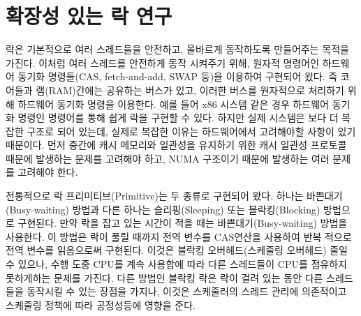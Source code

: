 \newpage
\section{확장성 있는 락 연구}
\label{sec:lockrelated}

락은 기본적으로 여러 스레드들을 안전하고, 올바르게 동작하도록 만들어주는 목적을 가진다.
이처럼 여러 스레드를 안전하게 동작 시켜주기 위해, 원자적 명령어인 하드웨어 동기화 명령들(CAS,
fetch-and-add, SWAP 등)을 이용하여 구현되어 왔다. 
즉 코어들과 램(RAM)간에는 공유하는 버스가 있고, 이러한 버스를 원자적으로 
처리하기 위해 하드웨어 동기화 명령을 이용한다. 
예를 들어 x86 시스템 같은 경우 하드웨어 동기화 명령인  명령어를 통해 쉽게 락을 구현할 수 있다.
하지만 실제 시스템은 보다 더 복잡한 구조로 되어 있는데, 
실제로 복잡한 이유는 하드웨어에서 고려해야할 사항이 있기 때문이다. 
먼저 중간에 캐시 메모리와 일관성을 유지하기 위한 캐시 일관성 
프로토콜 때문에 발생하는 문제를 고려해야 하고, NUMA 구조이기 때문에 발생하는 여러 문제를 고려해야 한다. 


전통적으로 락 프리미티브(Primitive)는 두 종류로 구현되어 왔다.
하나는 바쁜대기(Busy-waiting) 방법과 다른 하나는 슬리핑(Sleeping) 또는 블락킹(Blocking) 방법으로 구현된다.
만약 락을 잡고 있는 시간이 적을 때는 바쁜대기(Busy-waiting) 방법을 사용한다. 
이 방법은 락이 풀릴 때까지 전역 변수를 CAS연산을 사용하여 반복 적으로 전역 변수를 읽음으로써 구현된다.
이것은 블락킹 오버헤드(스케줄링 오버헤드) 줄일 수 있으나, 
수행 도중 CPU를 계속 사용함에 따라 다른 스레드들이 CPU를 점유하지 못하게하는 문제를 가진다.
다른 방법인 블락킹 락은 락이 걸려 있는 동안 다른 스레드들을 동작시킬 수 있는 장점을 가지나,
이것은 스케줄러의 스레드 관리에 의존적이고 스케줄링 정책에 따라 공정성등에 영향을 준다.

